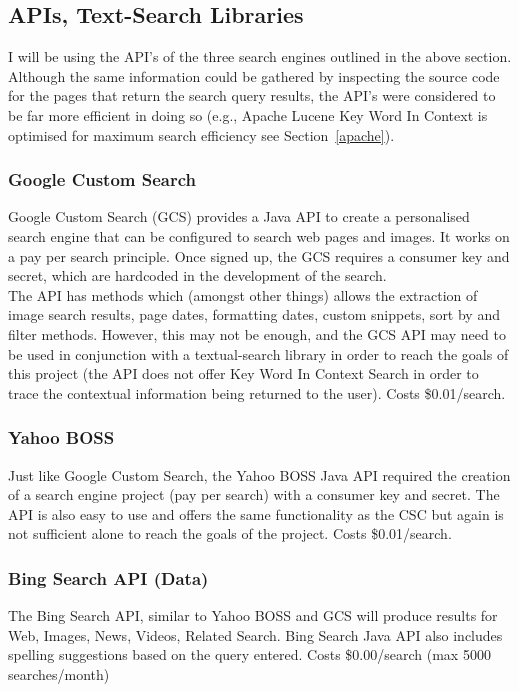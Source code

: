 \documentclass[10pt]{article}
\begin{document}
\subsection{APIs, Text-Search Libraries}
I will be using the API’s of the three search engines outlined in the above section. Although the same information could be gathered by inspecting the source code for the pages that return the search query results, the API’s were considered to be far more efficient in doing so (e.g., Apache Lucene Key Word In Context is optimised for maximum search efficiency see Section~\ref{apache}). 

\subsubsection{Google Custom Search}
Google Custom Search (GCS) provides a Java API to create a personalised search engine that can be configured to search web pages and images. It works on a pay per search principle. Once signed up, the GCS requires a consumer key and secret, which are hardcoded in the development of the search.\\
The API has methods which (amongst other things) allows the extraction of image search results, page dates, formatting dates, custom snippets, sort by and filter methods. However, this may not be enough, and the GCS API may need to be used in conjunction with a textual-search library in order to reach the goals of this project (the API does not offer Key Word In Context Search in order to trace the contextual information being returned to the user). Costs \$0.01/search.

\subsubsection{Yahoo BOSS}
Just like Google Custom Search, the Yahoo BOSS Java API required the creation of a search engine project (pay per search) with a consumer key and secret. The API is also easy to use and offers the same functionality as the CSC but again is not sufficient alone to reach the goals of the project. Costs \$0.01/search.

\subsubsection{Bing Search API (Data)}
The Bing Search API, similar to Yahoo BOSS and GCS will produce results for Web, Images, News, Videos, Related Search. Bing Search Java API also includes spelling suggestions based on the query entered. Costs \$0.00/search (max 5000 searches/month)
\end{document}
